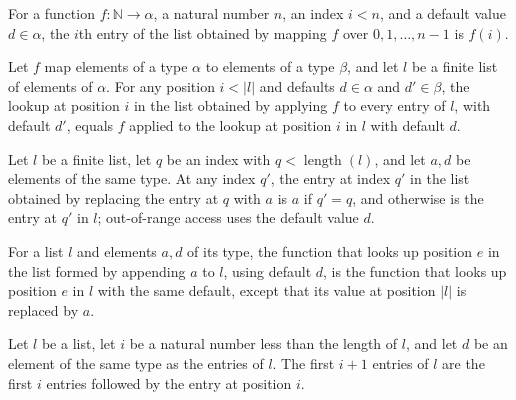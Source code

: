\begin{theorem}
\label{List.getD_map_range}
\leanok
{}
For a function $f:\mathbb{N}\to\alpha$, a natural number $n$, an index $i<n$, and a
default value $d\in\alpha$, the $i$th entry of the list obtained by mapping $f$ over
$0,1,\ldots,n-1$ is $f(i)$.
\end{theorem}

\begin{theorem}
\label{List.getD_map_of_lt}
\leanok
{}
Let $f$ map elements of a type $\alpha$ to elements of a type $\beta$, and let $l$ be a
finite list of elements of $\alpha$. For any position $i<|l|$ and defaults $d\in\alpha$
and $d'\in\beta$, the lookup at position $i$ in the list obtained by applying $f$ to
every entry of $l$, with default $d'$, equals $f$ applied to the lookup at position $i$
in $l$ with default $d$.
\end{theorem}

\begin{theorem}
\label{List.getD_set_of_lt}
\leanok
{}
Let $l$ be a finite list, let $q$ be an index with $q<\operatorname{length}(l)$, and let
$a,d$ be elements of the same type. At any index $q'$, the entry at index $q'$ in the
list obtained by replacing the entry at $q$ with $a$ is $a$ if $q'=q$, and otherwise is
the entry at $q'$ in $l$; out-of-range access uses the default value $d$.
\end{theorem}

\begin{theorem}
\label{List.getD_append_singleton}
\leanok
{}
For a list $l$ and elements $a,d$ of its type, the function that looks up position $e$
in the list formed by appending $a$ to $l$, using default $d$, is the function that
looks up position $e$ in $l$ with the same default, except that its value at position
$|l|$ is replaced by $a$.
\end{theorem}

\begin{theorem}
\label{List.take_succ_getD}
\leanok
{}
Let $l$ be a list, let $i$ be a natural number less than the length of $l$, and let $d$
be an element of the same type as the entries of $l$. The first $i+1$ entries of $l$ are
the first $i$ entries followed by the entry at position $i$.
\end{theorem}

